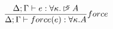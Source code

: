 \[
\frac { \Delta ;\Gamma \vdash e:\forall\kappa.\rhd^{\!\!\!\kappa} A }{ \Delta;\Gamma \vdash force(e) : \forall\kappa.A } force
\]

